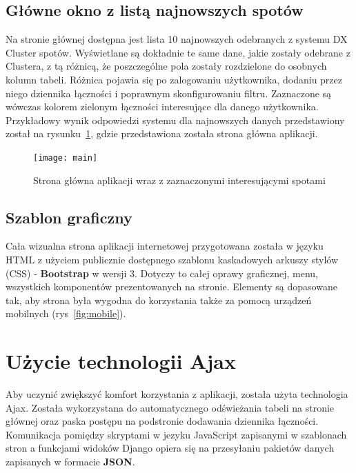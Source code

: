 \documentclass[]{mgr}
\begin{document}
            \subsection{Główne okno z listą najnowszych spotów}
            Na stronie głównej dostępna jest lista 10 najnowszych odebranych z systemu DX Cluster spotów. Wyświetlane są dokładnie te same dane, jakie zostały odebrane z Clustera, z tą różnicą, że poszczególne pola zostały rozdzielone do osobnych kolumn tabeli. Różnica pojawia się po zalogowaniu użytkownika, dodaniu przez niego dziennika łączności i poprawnym skonfigurowaniu filtru. Zaznaczone są wówczas kolorem zielonym łączności interesujące dla danego użytkownika. Przykładowy wynik odpowiedzi systemu dla najnowszych danych przedstawiony został na rysunku~\ref{fig:main}, gdzie przedstawiona została strona główna aplikacji.
            \begin{figure}[hb!]
                \centering
                \texttt{[image: main]}
                \caption{Strona główna aplikacji wraz z zaznaczonymi interesującymi spotami}
                \label{fig:main}
            \end{figure}

            \subsection{Szablon graficzny}
            Cała wizualna strona aplikacji internetowej przygotowana została w języku HTML z użyciem publicznie dostępnego szablonu kaskadowych arkuszy stylów (CSS) - \textbf{Bootstrap} w wersji 3. Dotyczy to całej oprawy graficznej, menu, wszystkich komponentów prezentowanych na stronie. Elementy są dopasowane tak, aby strona była wygodna do korzystania także za pomocą urządzeń mobilnych (rys~\ref{fig:mobile}).

        \section{Użycie technologii Ajax}
        Aby uczynić zwiększyć komfort korzystania z aplikacji, została użyta technologia Ajax. Została wykorzystana do automatycznego odświeżania tabeli na stronie głównej oraz paska postępu na podstronie dodawania dziennika łączności. Komunikacja pomiędzy skryptami w jezyku JavaScript zapisanymi w szablonach stron a funkcjami widoków Django opiera się na przesyłaniu pakietów danych zapisanych w formacie \textbf{JSON}.
\end{document}

